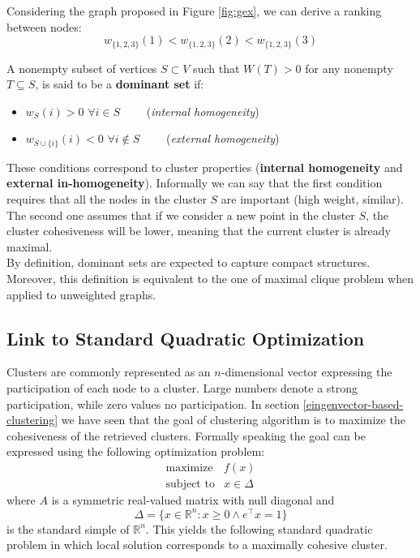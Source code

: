
Considering the graph proposed in Figure \ref{fig:gex}, we can derive a ranking between nodes: $$w_{\{1,2,3\}}(1) < w_{\{1,2,3\}}(2) < w_{\{1,2,3\}}(3)$$
\begin{defn}{} A nonempty subset of vertices $S\subset V$ such that $W(T)>0$ for any nonempty $T \subseteq S$, is said to be a \textbf{dominant set} if:
\begin{itemize}
	\item $w_S(i) > 0$ $\forall i \in S \qquad$ (\textit{internal homogeneity})
	\item $w_{S \cup \{i\}}(i) < 0$ $\forall i \notin S \qquad$ (\textit{external homogeneity})
\end{itemize}
\end{defn}
These conditions correspond to cluster properties (\textbf{internal homogeneity} and \textbf{external in-homogeneity}). Informally we can say that the first condition requires that all the nodes in the cluster $S$ are important (high weight, similar). The second one assumes that if we consider a new point in the cluster $S$, the cluster cohesiveness will be lower, meaning that the current cluster is already maximal.\\
By definition, dominant sets are expected to capture compact structures. Moreover, this definition is equivalent to the one of maximal clique problem when applied to unweighted graphs.


\subsection{Link to Standard Quadratic Optimization}
Clusters are commonly represented as an $n$-dimensional vector expressing the participation of each node to a cluster. Large numbers denote a strong participation, while zero values no participation. In section \ref{eingenvector-based-clustering} we have seen that the goal of clustering algorithm is to maximize the cohesiveness of the retrieved clusters. Formally speaking the goal can be expressed using the following optimization problem:
\begin{equation}\label{SPQ}
\begin{array}{lcl}
\text{maximize} & f(x) \\
\text{subject to} & x \in \Delta
\end{array}
\end{equation}
where $A$ is a symmetric real-valued matrix with null diagonal and \begin{equation}
\Delta=\{x\in\mathbb{R}^n:x\geq 0 \land e^\top x = 1\}
\end{equation} is the standard simple of $\mathbb{R}^n$. This yields the following standard quadratic problem in which local solution corresponds to a maximally cohesive cluster.


